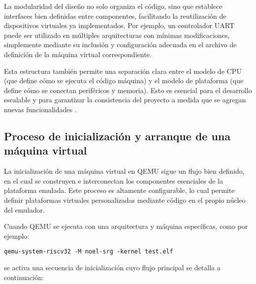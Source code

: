 La modularidad del diseño no solo organiza el código, sino que establece interfaces bien definidas entre componentes, facilitando la reutilización de dispositivos virtuales ya implementados. Por ejemplo, un controlador UART puede ser utilizado en múltiples arquitecturas con mínimas modificaciones, simplemente mediante su inclusión y configuración adecuada en el archivo de definición de la máquina virtual correspondiente.

Esta estructura también permite una separación clara entre el modelo de CPU (que define cómo se ejecuta el código máquina) y el modelo de plataforma (que define cómo se conectan periféricos y memoria). Esto es esencial para el desarrollo escalable y para garantizar la consistencia del proyecto a medida que se agregan nuevas funcionalidades \cite{qemu_docs_master}.

\subsection{Proceso de inicialización y arranque de una máquina virtual}
\label{subsec:inicio-maquina-qemu}

La inicialización de una máquina virtual en QEMU sigue un flujo bien definido, en el cual se construyen e interconectan los componentes esenciales de la plataforma emulada. Este proceso es altamente configurable, lo cual permite definir plataformas virtuales personalizadas mediante código en el propio núcleo del emulador.

Cuando QEMU se ejecuta con una arquitectura y máquina específicas, como por ejemplo:

\begin{verbatim}
qemu-system-riscv32 -M noel-srg -kernel test.elf
\end{verbatim}

se activa una secuencia de inicialización cuyo flujo principal se detalla a continuación:

